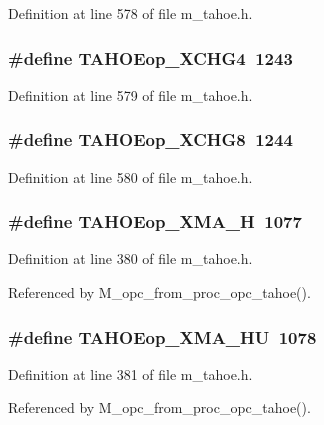Definition at line 578 of file m\_\-tahoe.h.
\subsubsection{\setlength{\rightskip}{0pt plus 5cm}\#define TAHOEop\_\-XCHG4~1243}\label{m__tahoe_8h_7c0a5144a0e3873dde7db7b232d168e1}




Definition at line 579 of file m\_\-tahoe.h.
\subsubsection{\setlength{\rightskip}{0pt plus 5cm}\#define TAHOEop\_\-XCHG8~1244}\label{m__tahoe_8h_68e1e78b6b84d1df42c299f17b34fe97}




Definition at line 580 of file m\_\-tahoe.h.
\subsubsection{\setlength{\rightskip}{0pt plus 5cm}\#define TAHOEop\_\-XMA\_\-H~1077}\label{m__tahoe_8h_00d5da493418b046813278289a8e5707}




Definition at line 380 of file m\_\-tahoe.h.

Referenced by M\_\-opc\_\-from\_\-proc\_\-opc\_\-tahoe().
\subsubsection{\setlength{\rightskip}{0pt plus 5cm}\#define TAHOEop\_\-XMA\_\-HU~1078}\label{m__tahoe_8h_9125b7382f1ce33235ca157b7d01918a}




Definition at line 381 of file m\_\-tahoe.h.

Referenced by M\_\-opc\_\-from\_\-proc\_\-opc\_\-tahoe().
